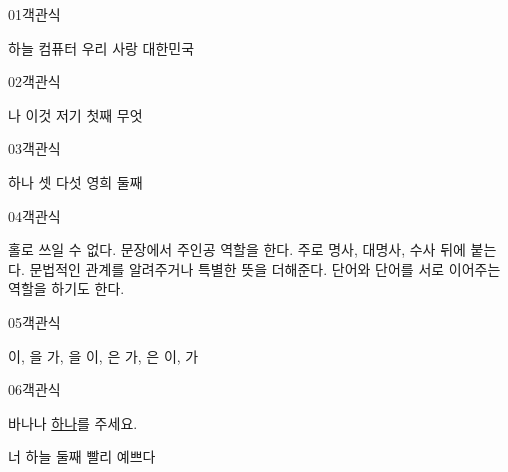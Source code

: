 \documentclass[fs9,seriesFre]{korfarm-base}
\begin{document}

\par\medskip
\kfBeginMC
\begin{kfQBlock}{01}{객관식}
\begin{kfChoices}
\kfChoice 하늘
\kfChoice 컴퓨터
\kfChoice 우리
\kfChoice 사랑
\kfChoice 대한민국
\end{kfChoices}
\end{kfQBlock}
\begin{kfQBlock}{02}{객관식}
\begin{kfChoices}
\kfChoice 나
\kfChoice 이것
\kfChoice 저기
\kfChoice 첫째
\kfChoice 무엇
\end{kfChoices}
\end{kfQBlock}
\begin{kfQBlock}{03}{객관식}
\begin{kfChoices}
\kfChoice 하나
\kfChoice 셋
\kfChoice 다섯
\kfChoice 영희
\kfChoice 둘째
\end{kfChoices}
\end{kfQBlock}
\begin{kfQBlock}{04}{객관식}
\begin{kfChoices}
\kfChoice 홀로 쓰일 수 없다.
\kfChoice 문장에서 주인공 역할을 한다.
\kfChoice 주로 명사, 대명사, 수사 뒤에 붙는다.
\kfChoice 문법적인 관계를 알려주거나 특별한 뜻을 더해준다.
\kfChoice 단어와 단어를 서로 이어주는 역할을 하기도 한다.
\end{kfChoices}
\end{kfQBlock}
\begin{kfQBlock}{05}{객관식}
\begin{kfChoices}
\kfChoice 이, 을
\kfChoice 가, 을
\kfChoice 이, 은
\kfChoice 가, 은
\kfChoice 이, 가
\end{kfChoices}
\end{kfQBlock}
\begin{kfQBlock}{06}{객관식}
\begin{kfEvidence}바나나 \uline{하나}를 주세요.\end{kfEvidence}
\begin{kfChoices}
\kfChoice 너
\kfChoice 하늘
\kfChoice 둘째
\kfChoice 빨리
\kfChoice 예쁘다
\end{kfChoices}
\end{kfQBlock}
\end{document}
